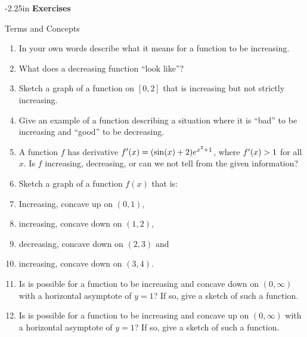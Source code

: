 \begin{adjustwidth*}{}{-2.25in}
\textbf{{\large Exercises}}
\setlength{\columnsep}{25pt}
\begin{multicols*}{2}
\noindent Terms and Concepts \small
\begin{enumerate}[1)]
\item In your own words describe what it means for a function to be increasing.
\item What does a decreasing function ``look like''?
\item Sketch a graph of a function on $[0,2]$ that is increasing but not strictly increasing.
\item Give an example of a function describing a situation where it is ``bad'' to be increasing and ``good'' to be decreasing.
\item A function $f$ has derivative $f'(x) = (\sin(x)+2)e^{x^2+1}$, where $f'(x) >1 $ for all $x$. Is $f$ increasing, decreasing, or can we not tell from the given information?
\item Sketch a graph of a function $f(x)$ that is:
	\ba
	\item		Increasing, concave up on $(0,1)$,
	\item		increasing, concave down on $(1,2)$,
	\item		decreasing, concave down on $(2,3)$ and 
	\item		increasing, concave down on $(3,4)$.
	\ea
\item Is is possible for a function to be increasing and concave down on $(0,\infty)$ with a horizontal asymptote of $y=1$? If so, give a sketch of such a function.
\item Is is possible for a function to be increasing and concave up on $(0,\infty)$ with a horizontal asymptote of $y=1$? If so, give a sketch of such a function.
\end{enumerate} 

 \small



\end{multicols*}
\end{adjustwidth*}
